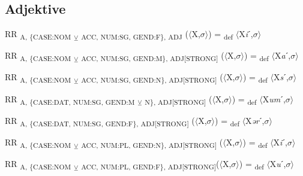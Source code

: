 {\subsection{Adjektive}

\begin{exe}
 RR \textsubscript{A, \{CASE:NOM} \textsubscript{${\veebar}$}\textsubscript{ ACC, NUM:SG, GEND:F\}, ADJ} ($\langle$X,$\sigma $$\rangle$) = \textsubscript{def} $\langle$X\textit{i}ˊ,$\sigma $$\rangle$
\end{exe}

\begin{exe}
 RR \textsubscript{A, \{CASE:NOM} \textsubscript{${\veebar}$}\textsubscript{ ACC, NUM:SG, GEND:M\}, ADJ[STRONG]} ($\langle$X,$\sigma $$\rangle$) = \textsubscript{def} $\langle$X\textit{a}ˊ,$\sigma $$\rangle$
\end{exe}

\begin{exe}
 RR \textsubscript{A, \{CASE:NOM} \textsubscript{${\veebar}$}\textsubscript{ ACC, NUM:SG, GEND:N\}, ADJ[STRONG]} ($\langle$X,$\sigma $$\rangle$) = \textsubscript{def} $\langle$X\textit{s}ˊ,$\sigma $$\rangle$
\end{exe}

\begin{exe}
 RR \textsubscript{A, \{CASE:DAT, NUM:SG, GEND:M} \textsubscript{${\veebar}$}\textsubscript{ N\}, ADJ[STRONG]} ($\langle$X,$\sigma $$\rangle$) = \textsubscript{def} $\langle$X\textit{um}ˊ,$\sigma $$\rangle$
\end{exe}

\begin{exe}
 RR \textsubscript{A, \{CASE:DAT, NUM:SG, GEND:F\}, ADJ[STRONG]} ($\langle$X,$\sigma $$\rangle$) = \textsubscript{def} $\langle$X\textit{ər}ˊ,$\sigma $$\rangle$
\end{exe}

\begin{exe}
 RR \textsubscript{A, \{CASE:NOM} \textsubscript{${\veebar}$}\textsubscript{ ACC, NUM:PL, GEND:N\}, ADJ[STRONG]} ($\langle$X,$\sigma $$\rangle$) = \textsubscript{def} $\langle$X\textit{i}ˊ,$\sigma $$\rangle$
\end{exe}

\begin{exe}
 RR \textsubscript{A, \{CASE:NOM} \textsubscript{${\veebar}$}\textsubscript{ ACC, NUM:PL, GEND:F\}, ADJ[STRONG]}($\langle$X,$\sigma $$\rangle$) = \textsubscript{def} $\langle$X\textit{u}ˊ,$\sigma $$\rangle$
\end{exe}

}
